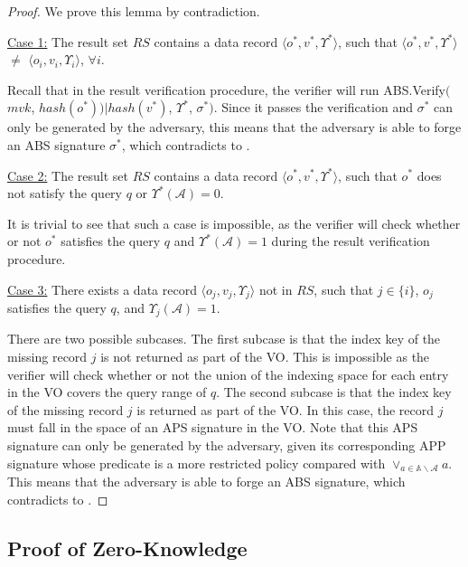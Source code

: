 \begin{proof}
    We prove this lemma by contradiction.

    \noindent\underline{Case 1:} The result set $RS$ contains a data record $\langle o^*, v^*, \Upsilon^*\rangle$, such that $\langle o^*, v^*, \Upsilon^*\rangle$ $\neq$ $\langle o_i, v_i, \Upsilon_i\rangle$, $\forall i$.

    Recall that in the result verification procedure, the verifier will run \textsf{ABS.Verify}$($$mvk$, $ hash(o^*))|hash(v^*)$, $\Upsilon^*$, $\sigma^*)$. Since it passes the verification and $\sigma^*$ can only be generated by the adversary, this means that the adversary is able to forge an ABS signature $\sigma^*$, which contradicts to .

    \noindent\underline{Case 2:} The result set $RS$ contains a data record $\langle o^*, v^*, \Upsilon^*\rangle$, such that $o^*$ does not satisfy the query $q$ or $\Upsilon^*(\mathcal{A}) = 0$.

    It is trivial to see that such a case is impossible, as the verifier will check whether or not $o^*$ satisfies the query $q$ and $\Upsilon^*(\mathcal{A}) = 1$ during the result verification procedure.

    \noindent\underline{Case 3:} There exists a data record $\langle o_j, v_j, \Upsilon_j\rangle$ not in $RS$, such that $j \in \{i\}$, $o_j$ satisfies the query $q$, and $\Upsilon_j(\mathcal{A})= 1$.

    There are two possible subcases. The first subcase is that the index key of the missing record $j$ is not returned as part of the VO. This is impossible as the verifier will check whether or not the union of the indexing space for each entry in the VO covers the query range of $q$. The second subcase is that the index key of the missing record $j$ is returned as part of the VO. In this case, the record $j$ must fall in the space of an APS signature in the VO. Note that this APS signature can only be generated by the adversary, given its corresponding APP signature whose predicate is a more restricted policy compared with $\lor_{a \in \mathbb{A}\backslash\mathcal{A}} a$.
   This means that the adversary is able to forge an ABS signature,
   which contradicts to .
\end{proof}

\subsection{Proof of Zero-Knowledge}

